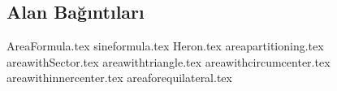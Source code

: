 \subsection{Alan Bağıntıları}
{AreaFormula.tex}
\newpage
{sineformula.tex}
\newpage
{Heron.tex}
\newpage
{areapartitioning.tex}
\newpage
{areawithSector.tex}
\newpage
{areawithtriangle.tex}
\newpage
{areawithcircumcenter.tex}
\newpage
{areawithinnercenter.tex}
\newpage
{areaforequilateral.tex}
\newpage